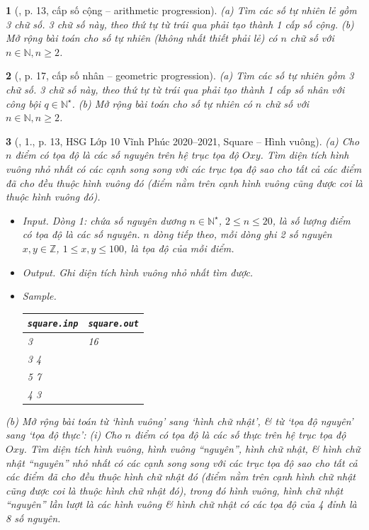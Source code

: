 \documentclass{article}
\newtheorem{baitoan}{}
\begin{document}
\begin{baitoan}[\cite{Huy_sang_tao_thuat_toan_lap_trinh_tap_1}, p. 13, cấp số cộng -- arithmetic progression]
	(a) Tìm các số tự nhiên lẻ gồm 3 chữ số. 3 chữ số này, theo thứ tự từ trái qua phải tạo thành 1 cấp số cộng. (b) Mở rộng bài toán cho số tự nhiên (không nhất thiết phải lẻ) có $n$ chữ số với $n\in\mathbb{N},n\ge2$.
\end{baitoan}

\begin{baitoan}[\cite{Huy_sang_tao_thuat_toan_lap_trinh_tap_1}, p. 17, cấp số nhân -- geometric progression]
	(a) Tìm các số tự nhiên gồm 3 chữ số. 3 chữ số này, theo thứ tự từ trái qua phải tạo thành 1 cấp số nhân với công bội $q\in\mathbb{N}^\star$. (b) Mở rộng bài toán cho số tự nhiên có $n$ chữ số với $n\in\mathbb{N},n\ge2$.
\end{baitoan}

\begin{baitoan}[\cite{Trung_HSG_THPT_Tin}, 1., p. 13, HSG Lớp 10 Vĩnh Phúc 2020--2021, Square -- Hình vuông]
	(a) Cho $n$ điểm có tọa độ là các số nguyên trên hệ trục tọa độ $Oxy$. Tìm diện tích hình vuông nhỏ nhất có các cạnh song song với các trục tọa độ sao cho tất cả các điểm đã cho đều thuộc hình vuông đó (điểm nằm trên cạnh hình vuông cũng được coi là thuộc hình vuông đó).
	\begin{itemize}
		\item {\sf Input.} Dòng 1: chứa số nguyên dương $n\in\mathbb{N}^\star$, $2\le n\le20$, là số lượng điểm có tọa độ là các số nguyên. $n$ dòng tiếp theo, mỗi dòng ghi 2 số nguyên $x,y\in\mathbb{Z}$, $1\le x,y\le100$, là tọa độ của mỗi điểm.
		\item {\sf Output.} Ghi diện tích hình vuông nhỏ nhất tìm được.
		\item {\sf Sample.}
		\begin{table}[H]
			\centering
			\begin{tabular}{|l|l|}
				\hline
				{\tt square.inp} & {\tt square.out} \\
				\hline
				3 & 16 \\
				3 4 &  \\
				5 7 &  \\
				4 3 &  \\
				\hline
			\end{tabular}
		\end{table}
	\end{itemize}
	(b) Mở rộng bài toán từ `hình vuông' sang `hình chữ nhật', \& từ `tọa độ nguyên' sang `tọa độ thực': (i) Cho $n$ điểm có tọa độ là các số thực trên hệ trục tọa độ $Oxy$. Tìm diện tích hình vuông, hình vuông ``nguyên'', hình chữ nhật, \& hình chữ nhật ``nguyên'' nhỏ nhất có các cạnh song song với các trục tọa độ sao cho tất cả các điểm đã cho đều thuộc hình chữ nhật đó (điểm nằm trên cạnh hình chữ nhật cũng được coi là thuộc hình chữ nhật đó), trong đó {\rm hình vuông, hình chữ nhật ``nguyên''} lần lượt là các hình vuông \& hình chữ nhật có các tọa độ của 4 đỉnh là 8 số nguyên.
\end{baitoan}
\end{document}
